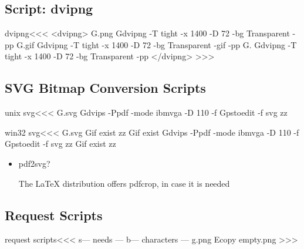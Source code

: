 \documentclass{article}
\begin{document}
\subsection{Script: dvipng}

\<dvipng\><<<
<dvipng>
G.png
Gdvipng -T tight -x 1400 -D 72 -bg Transparent -pp %
G.gif
Gdvipng -T tight -x 1400 -D 72 -bg Transparent -gif -pp %
G.
Gdvipng -T tight -x 1400 -D 72 -bg Transparent -pp %
</dvipng>
>>>


\subsection{SVG Bitmap Conversion Scripts} 

\<unix svg\><<<
G.svg
Gdvips -Ppdf -mode ibmvga -D 110 -f %
Gpstoedit -f svg zz%


\<win32 svg\><<<
G.svg
Gif exist zz%
Gif exist %
Gdvips -Ppdf -mode ibmvga -D 110 -f %
Gpstoedit -f svg zz%
Gif exist zz%

\begin{itemize}
\item
{}pdf2svg\EndLink ?

The LaTeX distribution offers pdfcrop, in case it is needed


\end{itemize}




\subsection{Request Scripts}

\<request scripts\><<<
 s--- needs --- %
 b--- characters ---
 g.png
 Ecopy  empty.png %
>>>
\end{document}
